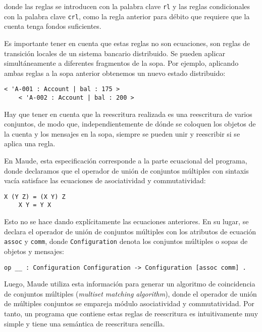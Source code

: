 \noindent
donde las reglas se introducen con la palabra clave \texttt{rl} y las reglas condicionales con la palabra clave \texttt{crl}, como la regla anterior para débito que requiere que la cuenta tenga fondos suficientes.

Es importante tener en cuenta que estas reglas no son ecuaciones, son reglas de transición locales de un sistema bancario distribuido. Se pueden aplicar simultáneamente a diferentes fragmentos de la sopa.
Por ejemplo, aplicando ambas reglas a la sopa anterior obtenemos un nuevo estado distribuido:

\begin{lstlisting}[language=Maude]
	< 'A-001 : Account | bal : 175 >
	< 'A-002 : Account | bal : 200 >
\end{lstlisting}
\medskip

\noindent
Hay que tener en cuenta que la reescritura realizada es una reescritura de varios conjuntos, de modo que, independientemente de dónde se coloquen los objetos de la cuenta y los mensajes en la sopa, siempre se pueden unir y reescribir si se aplica una regla.

En Maude, esta especificación corresponde a la parte ecuacional del programa, donde declaramos que el operador de unión de conjuntos múltiples con sintaxis vacía satisface las ecuaciones de asociatividad y commutatividad:

\begin{lstlisting}[language=Maude]
	X (Y Z) = (X Y) Z
	X Y = Y X
\end{lstlisting}
\medskip

\noindent
Esto no se hace dando explícitamente las ecuaciones anteriores. En su lugar, se declara el operador de unión de conjuntos múltiples con los atributos de ecuación \texttt{assoc} y \texttt{comm}, donde \texttt{Configuration} denota los conjuntos múltiples o sopas de objetos y mensajes:

\begin{lstlisting}[language=Maude]
	op __ : Configuration Configuration -> Configuration [assoc comm] .
\end{lstlisting}
\medskip

Luego, Maude utiliza esta información para generar un algoritmo de coincidencia de conjuntos múltiples (\textit{multiset matching algorithm}), donde el operador de unión de múltiples conjuntos se empareja módulo asociatividad y commutatividad. Por tanto, un programa que contiene estas reglas de reescritura es intuitivamente muy simple y tiene una semántica de reescritura sencilla.
\medskip

